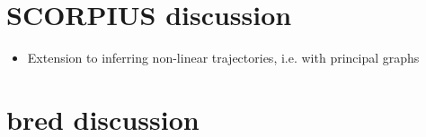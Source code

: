 \section{SCORPIUS discussion}
\begin{itemize}
	\item Extension to inferring non-linear trajectories, i.e. with principal graphs
\end{itemize}

\section{bred discussion}



